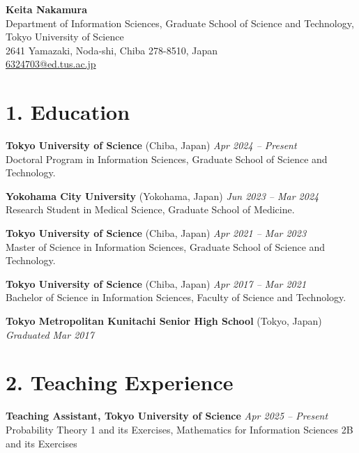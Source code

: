 \documentclass[11pt,a4paper]{article}
\begin{document}
\begin{center}
{\Large \textbf{Keita Nakamura}}\\[0.3em]
Department of Information Sciences, Graduate School of Science and Technology,\\
Tokyo University of Science\\
2641 Yamazaki, Noda-shi, Chiba 278-8510, Japan\\
\href{mailto:6324703@ed.tus.ac.jp}{6324703@ed.tus.ac.jp}
\end{center}

\section*{1. Education}

\noindent\textbf{Tokyo University of Science} (Chiba, Japan) \hfill \textit{Apr 2024 -- Present}\\
Doctoral Program in Information Sciences, Graduate School of Science and Technology.

\vspace{0.3em}
\noindent\textbf{Yokohama City University} (Yokohama, Japan) \hfill \textit{Jun 2023 -- Mar 2024}\\
Research Student in Medical Science, Graduate School of Medicine.

\vspace{0.3em}
\noindent\textbf{Tokyo University of Science} (Chiba, Japan) \hfill \textit{Apr 2021 -- Mar 2023}\\
Master of Science in Information Sciences, Graduate School of Science and Technology.

\vspace{0.3em}
\noindent\textbf{Tokyo University of Science} (Chiba, Japan) \hfill \textit{Apr 2017 -- Mar 2021}\\
Bachelor of Science in Information Sciences, Faculty of Science and Technology.

\vspace{0.3em}
\noindent\textbf{Tokyo Metropolitan Kunitachi Senior High School} (Tokyo, Japan) \hfill \textit{Graduated Mar 2017}

\section*{2. Teaching Experience}

\noindent\textbf{Teaching Assistant, Tokyo University of Science} \hfill \textit{Apr 2025 -- Present}\\
Probability Theory 1 and its Exercises, Mathematics for Information Sciences 2B and its Exercises
\end{document}
